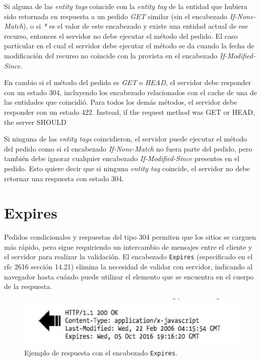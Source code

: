 \documentclass[a4paper,12pt]{report}
\begin{document}
Si alguna de las \emph{entity tags} coincide con la \emph{entity tag} de la entidad que hubiera sido retornada en respuesta a un pedido \emph{GET} similar (sin el encabezado
\emph{If-None-Match}), o si \emph{*} es el valor de este encabezado y existe una entidad actual de ese recurso, entonces el servidor no debe ejecutar el método del pedido.
El caso particular en el cual el servidor debe ejecutar el método se da cuando la fecha de modificación del recurso no coincide con la provista en el encabezado
\emph{If-Modified-Since}.

En cambio si el método del pedido es \emph{GET} o \emph{HEAD}, el servidor debe responder con un estado 304, incluyendo los encabezado relacionados con el cache de una de las
entidades que coincidió. Para todos los demás métodos, el servidor debe responder con un estado 422.
Instead, if the request method was GET or HEAD, the server SHOULD

Si ninguna de las \emph{entity tags} coincidieron, el servidor puede ejecutar el método del pedido como si el encabezado \emph{If-None-Match} no fuera parte del pedido, pero
también debe ignorar cualquier encabezado \emph{If-Modified-Since} presentes en el pedido. Esto quiere decir que si ninguna \emph{entity tag} coincide, el servidor no debe
retornar una respuesta con estado 304.

\section{Expires}

Pedidos condicionales y respuestas del tipo 304 permiten que los sitios se carguen más rápido, pero sigue requiriendo un intercambio de mensajes entre el cliente y el servidor
para realizar la validación. El encabezado \texttt{Expires} (especificado en el rfc 2616 \cite{rfc2616} sección 14.21) elimina la necesidad de validar con
servidor, indicando al navegador hasta cuándo puede utilizar el elemento que se encuentra en el cuerpo de la respuesta.

\begin{figure}[h]
\centering
\includegraphics[width=1\textwidth]{figuras/apendice/expires.jpg}
	\caption{Ejemplo de respuesta con el encabezado \texttt{Expires}.}
    \label{fig.expires}
\end{figure}
\end{document}
